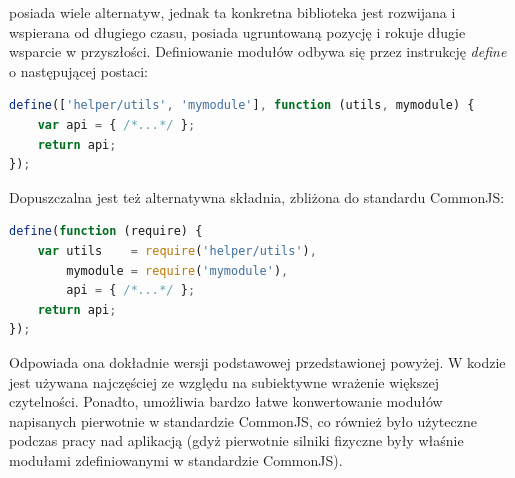  posiada wiele alternatyw, jednak ta konkretna biblioteka jest
rozwijana i wspierana od długiego czasu, posiada ugruntowaną pozycję i rokuje
długie wsparcie w przyszłości. Definiowanie modułów odbywa się przez instrukcję
\emph{define} o następującej postaci:

\begin{lstlisting}[language=JavaScript, caption=Definicja modułu
przy użyciu technologii RequireJS]
define(['helper/utils', 'mymodule'], function (utils, mymodule) {
	var api = { /*...*/ };
	return api;
});
\end{lstlisting}

Dopuszczalna jest też alternatywna składnia, zbliżona do standardu CommonJS:

\begin{lstlisting}[language=JavaScript, caption=Alternatywna składnia definicji 
modułu przy użyciu technologii RequireJS]
define(function (require) {
	var utils 	 = require('helper/utils'),
		mymodule = require('mymodule'),
		api = { /*...*/ };
	return api;
});
\end{lstlisting}

Odpowiada ona dokładnie wersji podstawowej przedstawionej powyżej. W kodzie
\en jest używana najczęściej ze względu na subiektywne wrażenie większej
czytelności. Ponadto, umożliwia bardzo łatwe konwertowanie modułów
napisanych pierwotnie w standardzie CommonJS, co również było użyteczne
podczas pracy nad aplikacją \en (gdyż pierwotnie silniki fizyczne były właśnie
modułami zdefiniowanymi w standardzie CommonJS).